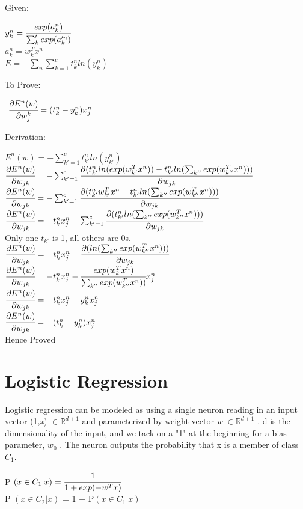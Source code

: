 \documentclass{article} %
\begin{document}
Given:
\begin{center}
	$y_k^n = \cfrac{exp(a_{k}^n)}{\sum_k' exp(a_k'^n)}$\\
    \hfill\break
$a_{k}^n = w_k^T x^n$\\
\hfill\break
$E = −\sum_n \sum_{k=1}^{c} t^n_k ln(y_k^n)$
\end{center}
To Prove:
\begin{center}
    -$\cfrac{\partial E^n(w)}{\partial w_j^k} = (t^n_k-y^n_k)x^n_j $\\
    \hfill\break
\end{center}
Derivation:
\begin{center}
$E^n(w) = -\sum_{k'=1}^{c} t^n_{k'} ln(y_{k'}^n)$\\
\hfill\break
\hfill\break
$\cfrac{\partial E^n(w)}{\partial w_{jk}} = -\sum_{k'=1}^{c}\cfrac{\partial(t^n_{k'}ln(exp(w_{k'}^Tx^n))-t^n_{k'}ln(\sum_{k''}exp(w_{k''}^Tx^n)))}{\partial w_{jk}}$\\
	\hfill\break
    \hfill\break
$\cfrac{\partial E^n(w)}{\partial w_{jk}} = -\sum_{k'=1}^{c}\cfrac{\partial(t^n_{k'}w_{k'}^Tx^n-t^n_{k'}ln(\sum_{k''}exp(w_{k''}^Tx^n)))}{\partial w_{jk}}$\\
    \hfill\break
    \hfill\break
$\cfrac{\partial E^n(w)}{\partial w_{jk}} = -t^n_kx^n_j-\sum_{k'=1}^{c}\cfrac{\partial (t^n_{k'}ln(\sum_{k''}exp(w_{k''}^Tx^n)))}{\partial w_{jk}}$\\
    \hfill\break
    \hfill\break
   Only one $t_{k'}$ is 1, all others are 0s.\\
    \hfill\break
 $\cfrac{\partial E^n(w)}{\partial w_{jk}} = -t^n_kx^n_j-\cfrac{\partial (ln(\sum_{k''}exp(w_{k''}^Tx^n)))}{\partial w_{jk}}$\\
    \hfill\break
    \hfill\break
$\cfrac{\partial E^n(w)}{\partial w_{jk}} = -t^n_kx^n_j-\cfrac{exp(w_k^Tx^n)}{\sum_{k''}exp(w_{k''}^Tx^n))}x^n_j$\\
    \hfill\break
    \hfill\break
$\cfrac{\partial E^n(w)}{\partial w_{jk}} = -t^n_kx^n_j-y_k^nx^n_j$\\
    \hfill\break
    \hfill\break
$\cfrac{\partial E^n(w)}{\partial w_{jk}} = -(t^n_k-y_k^n)x^n_j$\\
    \hfill\break
    Hence Proved 

\end{center}

\section{Logistic Regression}
Logistic regression can be modeled as using a single neuron reading in an input vector (1,{\sl x}) $\in \mathbb{R}^{d+1}$ and parameterized by weight vector {\sl w} $\in \mathbb{R}^{d+1}$ . d is the dimensionality of the input, and we tack on a "1" at the beginning for a bias parameter, $w_0$ . The neuron outputs the probability that x is a member of class $C_1$.\\
\begin{center}
P $(x \in C_1 |x) = \cfrac{1}{1+exp(-w^T x)}$\\
\hfill\break
\hfill\break
P $(x \in C_2 |x)$ = 1 − P$(x \in C_1 |x)$\\
\hfill\break
\end{center}
\end{document}
